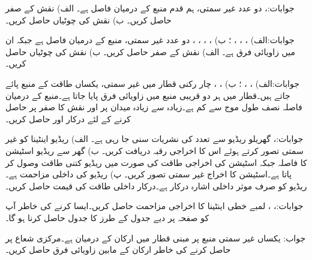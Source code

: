 جوابات:، 
دو عدد غیر سمتی، ہم قدم منبع کے درمیان فاصل  ہے۔ الف) نقش کے صفر حاصل کریں۔ ب) نقش کی چوٹیاں حاصل کریں۔

جوابات:الف) ، ، ، ؛ ب) ، ، ، ، 
دو عدد غیر سمتی، منبع کے درمیان فاصل  ہے جبکہ ان میں زاویائی فرق  ہے۔ الف) نقش کے صفر حاصل کریں۔ ب) نقش کی چوٹیاں حاصل کریں۔

جوابات:الف) ، ، ؛ ب) ، ، 
چار رکنی قطار میں غیر سمتی،  یکساں طاقت کے منبع پائے جاتے ہیں۔قطار میں ہر دو قریبی منبع میں  زاویائی فرق پایا جاتا ہے۔منبع کے درمیان فاصلہ نصف طول موج سے کم  ہے۔زیادہ سے زیادہ میدان  پر  اور نقش کا صفر  پر حاصل کرنے کے لئے درکار  اور  حاصل کریں۔ 

جوابات:، 
گھریلو ریڈیو سے  تعدد کی نشریات سنی جا رہی ہے۔ الف) ریڈیو اینٹینا کو غیر سمتی تصور کرتے ہوئے اس کا اخراجی رقبہ دریافت کریں۔ ب) گھر سے ریڈیو اسٹیشن کا فاصلہ  جبکہ اسٹیشن کی اخراجی طاقت  کی صورت میں ریڈیو کتنی طاقت وصول کر پاتا ہے۔اسٹیشن کا اخراج غیر سمتی تصور کریں۔ پ) ریڈیو کی داخلی مزاحمت  ہے۔ریڈیو کو صرف  موثر داخلی اشارہ درکار ہے۔درکار داخلی طاقت کی قیمت حاصل کریں۔  

جوابات:، ، 
 لمبے خطی اینٹینا کا اخراجی مزاحمت حاصل کریں۔ایسا کرنے کی خاطر آپ کو صفحہ  پر دیے جدول  کے طرز کا جدول حاصل کرنا ہو گا۔

جواب: 
یکساں غیر سمتی منبع پر مبنی قطار میں ارکان کے درمیان  ہے۔مرکزی شعاع  پر حاصل کرنے کی خاطر ارکان کے مابین زاویائی فرق  حاصل کریں۔ 

